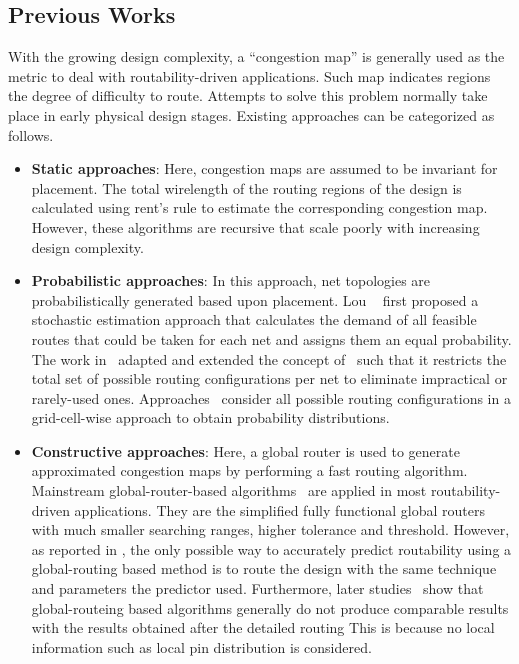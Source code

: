 \subsection{Previous Works}
With the growing design complexity, a ``congestion map'' is generally used as the metric to deal with routability-driven applications.
Such map indicates regions the degree of difficulty to route.
Attempts to solve this problem normally take place in early physical design stages.
Existing approaches can be categorized as follows.
\begin{itemize}
\item \textbf{Static approaches}: Here, congestion maps are assumed to be invariant  for placement. The total wirelength of the routing regions of the design is calculated using rent's rule \cite{rentsrule,rentsrulerecursive} to estimate the corresponding congestion map. However, these algorithms are recursive that scale poorly with increasing design complexity. 
\item \textbf{Probabilistic approaches}: In this approach, net topologies are probabilistically generated based upon placement.  Lou \etal~\cite{first} first proposed a stochastic estimation approach that calculates the demand of all feasible routes that could be taken for each net and assigns them an equal probability. The work in~\cite{modeling} adapted and extended the concept of~\cite{first} such that it restricts the total set of possible routing configurations per net to eliminate impractical or rarely-used ones. Approaches~\cite{SMD, 3step} consider all possible routing configurations in a grid-cell-wise approach to obtain probability distributions.
\item \textbf{Constructive approaches}: Here, a global router is used to generate approximated congestion maps by performing a fast routing algorithm. Mainstream global-router-based algorithms~\cite{mixedsizeplacement,ripple,simplr,nctufast,fastroute} are applied in most routability-driven applications. They are the simplified fully functional global routers with much smaller searching ranges, higher tolerance and threshold. However, as reported in \cite{fastroute}, the only possible way to accurately predict routability using a global-routing based method is to route the design with the same technique and parameters the predictor used. Furthermore, later studies~\cite{study,ispd14,ispd15} show that global-routeing based algorithms generally do not produce comparable results with the results obtained after the detailed routing This is because no local information such as local pin distribution is considered.

\end{itemize}
